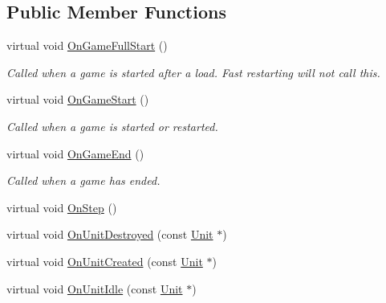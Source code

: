 \subsection*{Public Member Functions}
\begin{DoxyCompactItemize}
\item 
\mbox{\label{classsc2_1_1_client_events_ab980f6942030d3a0cd42e00782742237}} 
virtual void \hyperlink{classsc2_1_1_client_events_ab980f6942030d3a0cd42e00782742237}{On\+Game\+Full\+Start} ()
\begin{DoxyCompactList}\small\item\em Called when a game is started after a load. Fast restarting will not call this. \end{DoxyCompactList}\item 
\mbox{\label{classsc2_1_1_client_events_a6e2542b183f6ac980440cc93476163a3}} 
virtual void \hyperlink{classsc2_1_1_client_events_a6e2542b183f6ac980440cc93476163a3}{On\+Game\+Start} ()
\begin{DoxyCompactList}\small\item\em Called when a game is started or restarted. \end{DoxyCompactList}\item 
\mbox{\label{classsc2_1_1_client_events_a2c5023d18ffc88bed76c844e643ef60d}} 
virtual void \hyperlink{classsc2_1_1_client_events_a2c5023d18ffc88bed76c844e643ef60d}{On\+Game\+End} ()
\begin{DoxyCompactList}\small\item\em Called when a game has ended. \end{DoxyCompactList}\item 
virtual void \hyperlink{classsc2_1_1_client_events_a6f5839e220d2a5a19b30065e0b8290c4}{On\+Step} ()
\item 
virtual void \hyperlink{classsc2_1_1_client_events_a17297ffdf866ab1f4c3c31de64a1bc59}{On\+Unit\+Destroyed} (const \hyperlink{classsc2_1_1_unit}{Unit} $\ast$)
\item 
virtual void \hyperlink{classsc2_1_1_client_events_ac7fc1dae3607d7e4fea5680bcea903a0}{On\+Unit\+Created} (const \hyperlink{classsc2_1_1_unit}{Unit} $\ast$)
\item 
virtual void \hyperlink{classsc2_1_1_client_events_adce0fc98fa9c3cc092a5a8b3f2feef45}{On\+Unit\+Idle} (const \hyperlink{classsc2_1_1_unit}{Unit} $\ast$)

\end{DoxyCompactItemize}
